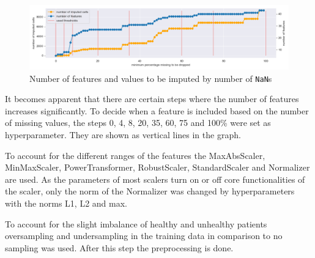 \begin{figure}[h]
	\centering
	\includegraphics[width=\textwidth]{images/percentageToBeDropped.png}
	\caption{Number of features and values to be imputed by number of \texttt{NaN}s}
	\label{fig:percentageToBeDropped}
\end{figure}

It becomes apparent that there are certain steps where the number of features increases significantly. To decide when a feature is included based on the number of missing values, the steps 0, 4, 8, 20, 35, 60, 75 and 100\% were set as hyperparameter. They are shown as vertical lines in the graph. 

To account for the different ranges of the features the MaxAbsScaler, MinMaxScaler, PowerTransformer, RobustScaler, StandardScaler and Normalizer are used. As the parameters of most scalers turn on or off core functionalities of the scaler, only the norm of the Normalizer was changed by hyperparameters with the norms L1, L2 and max.

To account for the slight imbalance of healthy and unhealthy patients oversampling and undersampling in the training data in comparison to no sampling was used. After this step the preprocessing is done. 


